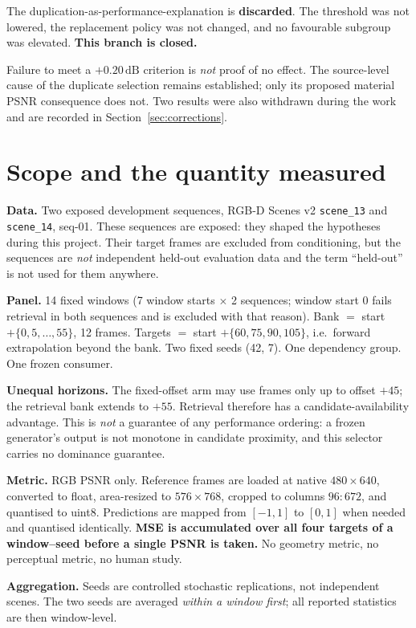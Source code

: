 \documentclass[11pt,a4paper]{article}
\newcommand{\code}[1]{\texttt{\small #1}}
\newcommand{\dB}{\,\mathrm{dB}}
\begin{document}
The duplication-as-performance-explanation is \textbf{discarded}. The threshold was not lowered, the
replacement policy was not changed, and no favourable subgroup was elevated. \textbf{This branch is
closed.}

Failure to meet a $+0.20\dB$ criterion is \emph{not} proof of no effect. The source-level cause of
the duplicate selection remains established; only its proposed material PSNR consequence does not.
Two results were also withdrawn during the work and are recorded in Section~\ref{sec:corrections}.

\section{Scope and the quantity measured}

\textbf{Data.} Two exposed development sequences, RGB-D Scenes v2 \code{scene\_13} and
\code{scene\_14}, seq-01. These sequences are exposed: they shaped the hypotheses during this
project. Their target frames are excluded from conditioning, but the sequences are \emph{not}
independent held-out evaluation data and the term ``held-out'' is not used for them anywhere.

\textbf{Panel.} 14 fixed windows (7 window starts $\times$ 2 sequences; window start 0 fails
retrieval in both sequences and is excluded with that reason). Bank $=$ start $+\{0,5,\dots,55\}$,
12 frames. Targets $=$ start $+\{60,75,90,105\}$, i.e.\ forward extrapolation beyond the bank. Two
fixed seeds (42, 7). One dependency group. One frozen consumer.

\textbf{Unequal horizons.} The fixed-offset arm may use frames only up to offset $+45$; the
retrieval bank extends to $+55$. Retrieval therefore has a candidate-availability advantage. This is
\emph{not} a guarantee of any performance ordering: a frozen generator's output is not monotone in
candidate proximity, and this selector carries no dominance guarantee.

\textbf{Metric.} RGB PSNR only. Reference frames are loaded at native $480\times640$, converted to
float, area-resized to $576\times768$, cropped to columns $96{:}672$, and quantised to uint8.
Predictions are mapped from $[-1,1]$ to $[0,1]$ when needed and quantised identically. \textbf{MSE is
accumulated over all four targets of a window--seed before a single PSNR is taken.} No geometry
metric, no perceptual metric, no human study.

\textbf{Aggregation.} Seeds are controlled stochastic replications, not independent scenes. The two
seeds are averaged \emph{within a window first}; all reported statistics are then window-level.
\end{document}
